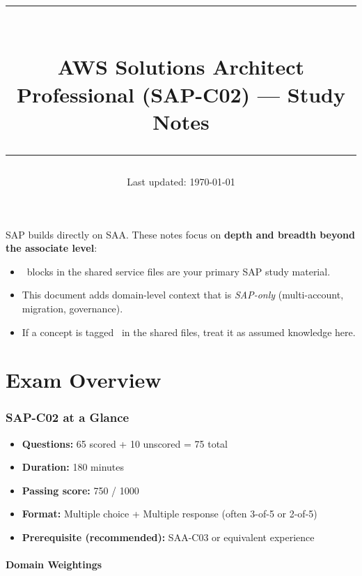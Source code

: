 \documentclass[12pt, a4paper]{article}
\title{
  \vspace{-1cm}
  {\color{awsorange}\rule{\linewidth}{3pt}}\\[8pt]
  {\Huge\bfseries\color{awsdark} AWS Solutions Architect}\\[4pt]
  {\large\color{sapcolor} Professional (SAP-C02) — Study Notes}\\[6pt]
  {\color{awsorange}\rule{\linewidth}{1pt}}
  \vspace{-8pt}
}
\author{}
\date{\small Last updated: \today}
\begin{document}
\maketitle
\thispagestyle{empty}

\begin{tcolorbox}[colback=sapcolor!5, colframe=sapcolor, title=Study strategy for SAP]
SAP builds directly on SAA. These notes focus on \textbf{depth and breadth beyond the associate level}:
\begin{itemize}
  \item \saptag\ blocks in the shared service files are your primary SAP study material.
  \item This document adds domain-level context that is \emph{SAP-only} (multi-account, migration, governance).
  \item If a concept is tagged \bothtag\ in the shared files, treat it as assumed knowledge here.
\end{itemize}
\end{tcolorbox}

\vspace{1em}
\tableofcontents
\newpage

\part{Exam Overview}

\section{SAP-C02 at a Glance}

\begin{keyfacts}
\begin{itemize}
  \item \textbf{Questions:} 65 scored + 10 unscored = 75 total
  \item \textbf{Duration:} 180 minutes
  \item \textbf{Passing score:} 750 / 1000
  \item \textbf{Format:} Multiple choice + Multiple response (often 3-of-5 or 2-of-5)
  \item \textbf{Prerequisite (recommended):} SAA-C03 or equivalent experience
\end{itemize}
\end{keyfacts}

\subsection{Domain Weightings}
\end{document}
